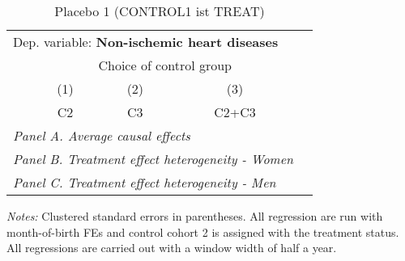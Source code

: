  \begin{table}[H] \centering \begin{threeparttable} \caption{Placebo 1 (CONTROL1 ist TREAT) } {\def\sym#1{\ifmmode^{#1}\else\(^{#1}\)\fi} \begin{tabular}{l*{4}{c}} \toprule \multicolumn{4}{l}{Dep. variable: \textbf{Non-ischemic heart diseases}} \\ & \multicolumn{3}{c}{Choice of control group} \\ \cmidrule(lr){2-4}
            &\multicolumn{1}{c}{(1)}&\multicolumn{1}{c}{(2)}&\multicolumn{1}{c}{(3)}\\
            &\multicolumn{1}{c}{C2}&\multicolumn{1}{c}{C3}&\multicolumn{1}{c}{C2+C3}\\
\midrule
 \multicolumn{4}{l}{\emph{Panel A. Average causal effects}} \\      \midrule\multicolumn{4}{l}{\emph{Panel B. Treatment effect heterogeneity - Women}} \\      \midrule\multicolumn{4}{l}{\emph{Panel C. Treatment effect heterogeneity - Men}} \\      
\bottomrule \end{tabular} } \begin{tablenotes} \item \scriptsize \emph{Notes:} Clustered standard errors in parentheses. All regression are run with month-of-birth FEs and control cohort 2 is assigned with the treatment status. All regressions are carried out with a window width of half a year. \end{tablenotes} \end{threeparttable} \end{table} 
